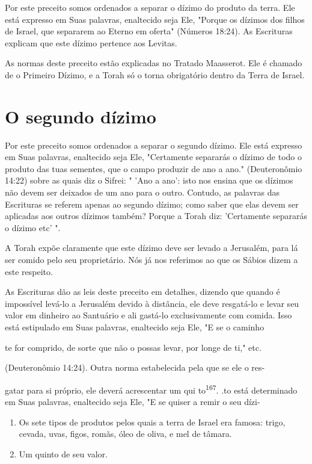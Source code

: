 Por este preceito somos ordenados a separar o dízimo do produto da
terra. Ele está expresso em Suas palavras, enaltecido seja Ele, "Porque
os dízimos dos filhos de Israel, que separarem ao Eterno em oferta"
(Números 18:24). As Escrituras explicam que este dízimo pertence aos
Levitas.

As normas deste preceito estão explicadas no Tratado Maasserot. Ele é
chamado de o Primeiro Dízimo, e a Torah só o torna obrigatório dentro da
Terra de Israel.

\section{O segundo dízimo}

Por este preceito somos ordenados a separar o segundo dízimo. Ele está
expresso em Suas palavras, enaltecido seja Ele, "Certamente separarás o
dízimo de todo o produto das tuas sementes, que o campo produzir de ano
a ano." (Deuteronômio 14:22) sobre as quais diz o Sifrei: " 'Ano a ano':
isto nos ensina que os dízimos não devem ser deixados de um ano para o
outro. Contudo, as palavras das Escrituras se referem apenas ao segundo
dízimo; co­mo saber que elas devem ser aplicadas aos outros dízimos
também? Porque a Torah diz: 'Certamente separarás o dízimo etc' ".

A Torah expõe claramente que este dízimo deve ser levado a Jerusa­lém,
para lá ser comido pelo seu proprietário. Nós já nos referimos ao que os
Sábios dizem a este respeito.

As Escrituras dão as leis deste preceito em detalhes, dizendo que
quan­do é impossível levá-lo a Jerusalém devido à distância, ele deve
resgatá-lo e le­var seu valor em dinheiro ao Santuário e ali gastá-lo
exclusivamente com comi­da. Isso está estipulado em Suas palavras,
enaltecido seja Ele, "E se o caminho

te for comprido, de sorte que não o possas levar, por longe de ti," etc.

(Deuteronômio 14:24). Outra norma estabelecida pela que se ele o res-

gatar para si próprio, ele deverá acrescentar um qui
to\textsuperscript{167}. .to está determinado
em Suas palavras, enaltecido seja Ele, "E se quiser a remir o seu
dízi-


\begin{enumerate}
\def\labelenumi{\arabic{enumi}.}
\setcounter{enumi}{165}
\item
 
 Os sete tipos de produtos pelos quais a terra de Israel era famosa:
 trigo, cevada, uvas, figos, romãs, óleo de oliva, e mel de tâmara.
 
\item
 
 Um quinto de seu valor.
 
\end{enumerate}




